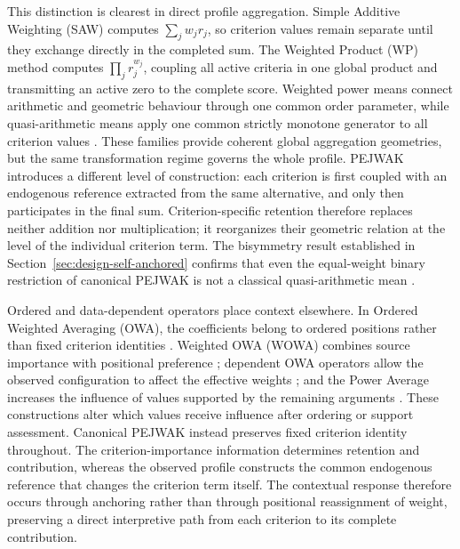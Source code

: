 \documentclass[reqno,11pt]{amsart}
\theoremstyle{definition}
\theoremstyle{plain}
\theoremstyle{remark}
\begin{document}
This distinction is clearest in direct profile aggregation. Simple
Additive Weighting (SAW) computes
$\sum_j w_jr_j$, so criterion values remain separate until they exchange
directly in the completed sum. The Weighted Product (WP) method computes
$\prod_j r_j^{w_j}$, coupling all active criteria in one global product
and transmitting an active zero to the complete score. Weighted power
means connect arithmetic and geometric behaviour through one common
order parameter, while quasi-arithmetic means apply one common
strictly monotone generator to all criterion values
\cite{Beliakov2007,Grabisch2009}. These families provide coherent global
aggregation geometries, but the same transformation regime governs the
whole profile. PEJWAK introduces a different level of construction: each
criterion is first coupled with an endogenous reference extracted from
the same alternative, and only then participates in the final sum.
Criterion-specific retention therefore replaces neither addition nor
multiplication; it reorganizes their geometric relation at the level of
the individual criterion term. The bisymmetry result established in
Section~\ref{sec:design-self-anchored} confirms that even the equal-weight
binary restriction of canonical PEJWAK is not a classical
quasi-arithmetic mean \cite{Aczel1948}.

Ordered and data-dependent operators place context elsewhere. In Ordered
Weighted Averaging (OWA), the coefficients belong to ordered positions
rather than fixed criterion identities \cite{Yager1988}. Weighted OWA
(WOWA) combines source importance with positional preference
\cite{Torra1997}; dependent OWA operators allow the observed
configuration to affect the effective weights \cite{Xu2006}; and the
Power Average increases the influence of values supported by the
remaining arguments \cite{Yager2001}. These constructions alter which
values receive influence after ordering or support assessment. Canonical
PEJWAK instead preserves fixed criterion identity throughout. The
criterion-importance information determines retention and contribution,
whereas the observed profile constructs the common endogenous reference
that changes the criterion term itself. The contextual response therefore
occurs through anchoring rather than through positional reassignment of
weight, preserving a direct interpretive path from each criterion to its
complete contribution.
\end{document}
